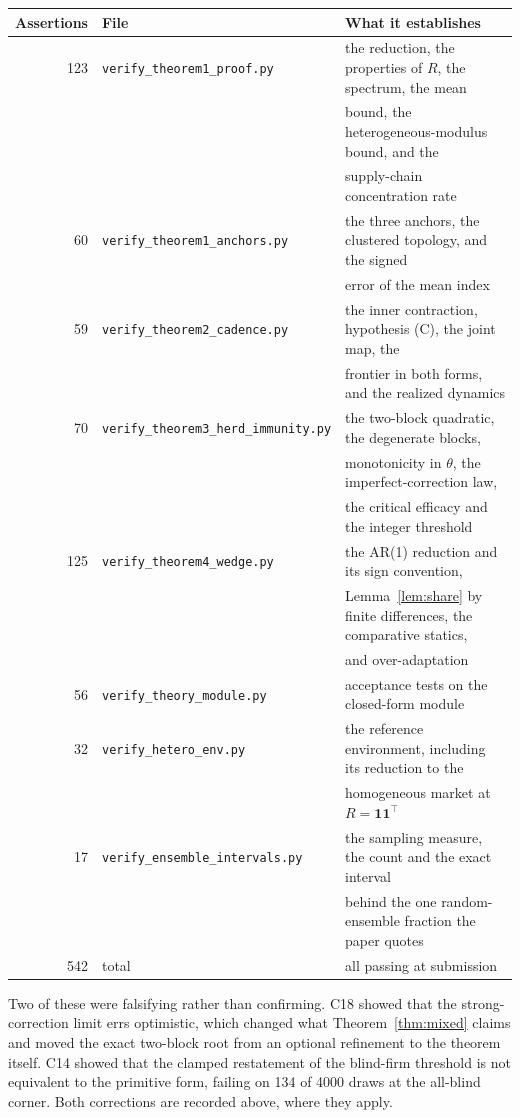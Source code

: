 \begin{center}
\footnotesize
\begin{tabular}{rll}
\toprule
Assertions & File & What it establishes \\
\midrule
123 & \texttt{verify\_theorem1\_proof.py} & the reduction, the properties of $R$, the spectrum, the mean \\
 & & bound, the heterogeneous-modulus bound, and the \\
 & & supply-chain concentration rate \\
60 & \texttt{verify\_theorem1\_anchors.py} & the three anchors, the clustered topology, and the signed \\
 & & error of the mean index \\
59 & \texttt{verify\_theorem2\_cadence.py} & the inner contraction, hypothesis (C), the joint map, the \\
 & & frontier in both forms, and the realized dynamics \\
70 & \texttt{verify\_theorem3\_herd\_immunity.py} & the two-block quadratic, the degenerate blocks, \\
 & & monotonicity in $\theta$, the imperfect-correction law, \\
 & & the critical efficacy and the integer threshold \\
125 & \texttt{verify\_theorem4\_wedge.py} & the AR(1) reduction and its sign convention, \\
 & & Lemma~\ref{lem:share} by finite differences, the comparative statics, \\
 & & and over-adaptation \\
56 & \texttt{verify\_theory\_module.py} & acceptance tests on the closed-form module \\
32 & \texttt{verify\_hetero\_env.py} & the reference environment, including its reduction to the \\
 & & homogeneous market at $R=\mathbf{1}\mathbf{1}^{\top}$ \\
17 & \texttt{verify\_ensemble\_intervals.py} & the sampling measure, the count and the exact interval \\
 & & behind the one random-ensemble fraction the paper quotes \\
\midrule
542 & total & all passing at submission \\
\bottomrule
\end{tabular}
\end{center}

Two of these were falsifying rather than confirming. C18 showed that the strong-correction limit errs optimistic, which changed what Theorem~\ref{thm:mixed} claims and moved the exact two-block root from an optional refinement to the theorem itself. C14 showed that the clamped restatement of the blind-firm threshold is not equivalent to the primitive form, failing on 134 of 4000 draws at the all-blind corner. Both corrections are recorded above, where they apply.

